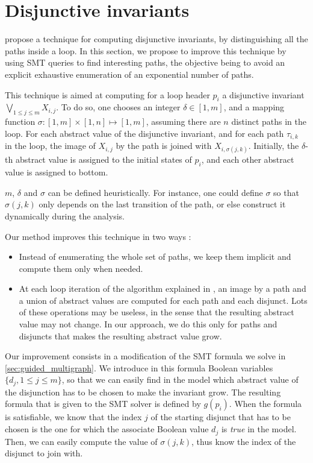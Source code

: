\documentclass[preprint]{sigplanconf}
\begin{document}
\section{Disjunctive invariants}
\label{sec:disjunctive}

\citet{DBLP:conf/pldi/GulwaniZ10} propose a technique for computing disjunctive invariants, by
distinguishing all the paths inside a loop. In
this section, we propose to improve this technique by using SMT queries to find
interesting paths, the objective being to avoid an explicit exhaustive
enumeration of an exponential number of paths.

This technique is aimed at computing for a loop header $p_i$ a disjunctive invariant
$\bigvee_{1\leq j \leq m} X_{i,j}$. 
To do so, one chooses an integer $\delta \in [1,m]$, and
a mapping function $\sigma: [1,m] \times [1,n] \mapsto [1,m]$, assuming there
are $n$ distinct paths in the loop.  For each
abstract value of the disjunctive invariant, and for each path $\tau_{i,k}$ in the loop, the
image of $X_{i,j}$ by the path is joined with
$X_{i,\sigma(j,k)}$.
Initially, the $\delta$-th abstract value is assigned to the initial states of
$p_i$, and each other abstract value is assigned to bottom.

$m$, $\delta$ and $\sigma$ can be defined heuristically.
For instance, one could define $\sigma$ so that $\sigma(j,k)$ only depends on the
last transition of the path, or else construct it dynamically during the
analysis.

Our method improves this technique in two ways :
\begin{itemize}
\item Instead of enumerating the whole set of paths, we keep them implicit and
compute them only when needed.
\item At each loop iteration of the algorithm explained in
\cite{DBLP:conf/pldi/GulwaniZ10}, an image by a path and a union of abstract
values are computed for each path and each disjunct. 
Lots of these operations may be useless, in the sense that the resulting
abstract value may not change.
In our approach, we do this only for paths and disjuncts that makes the
resulting abstract value grow.
\end{itemize}

Our improvement consists in a modification of the SMT formula we solve in
\ref{sec:guided_multigraph}.
We introduce in this formula Boolean variables $\{d_j, 1 \leq j \leq m\}$, so
that we can easily find in the model which abstract value of the disjunction has
to be chosen to make the invariant grow.
The resulting formula that is given to the SMT solver is defined
by $g(p_i)$.
When the formula is satisfiable, we know that the index $j$ of the starting
disjunct that has to be chosen is the one for which the associate Boolean value
$d_j$ is \emph{true} in the model. Then, we can easily compute the value of 
$\sigma(j,k)$, thus know the index of the disjunct to join with.
\end{document}
